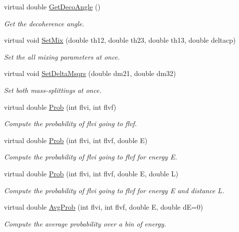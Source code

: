 \begin{DoxyCompactItemize}
virtual double \hyperlink{classOscProb_1_1PMNS__Deco_a5dadf6a39dec4a229babeff6a650179c}{Get\+Deco\+Angle} ()
\begin{DoxyCompactList}\small\item\em Get the decoherence angle. \end{DoxyCompactList}\item 
virtual void \hyperlink{classOscProb_1_1PMNS__Fast_ad849b2231d99c5d66fb3ade8efb896e1}{Set\+Mix} (double th12, double th23, double th13, double deltacp)
\begin{DoxyCompactList}\small\item\em Set the all mixing parameters at once. \end{DoxyCompactList}\item 
virtual void \hyperlink{classOscProb_1_1PMNS__Fast_a63733b246e6d2e609ce3de7a65ba5b9f}{Set\+Delta\+Msqrs} (double dm21, double dm32)
\begin{DoxyCompactList}\small\item\em Set both mass-\/splittings at once. \end{DoxyCompactList}\item 
virtual double \hyperlink{classOscProb_1_1PMNS__Base_aec5c399b93261f1962a4b7dbbb44b973}{Prob} (int flvi, int flvf)
\begin{DoxyCompactList}\small\item\em Compute the probability of flvi going to flvf. \end{DoxyCompactList}\item 
virtual double \hyperlink{classOscProb_1_1PMNS__Base_aa3cee10639d5c0879ccb9e78d62128d3}{Prob} (int flvi, int flvf, double E)
\begin{DoxyCompactList}\small\item\em Compute the probability of flvi going to flvf for energy E. \end{DoxyCompactList}\item 
virtual double \hyperlink{classOscProb_1_1PMNS__Base_a6e0a74508d9d6db7be02e242b8467563}{Prob} (int flvi, int flvf, double E, double L)
\begin{DoxyCompactList}\small\item\em Compute the probability of flvi going to flvf for energy E and distance L. \end{DoxyCompactList}\item 
virtual double \hyperlink{classOscProb_1_1PMNS__Base_ac03f754160422e6600da8dbae0f803ed}{Avg\+Prob} (int flvi, int flvf, double E, double dE=0)
\begin{DoxyCompactList}\small\item\em Compute the average probability over a bin of energy. \end{DoxyCompactList}\item 

\end{DoxyCompactItemize}
